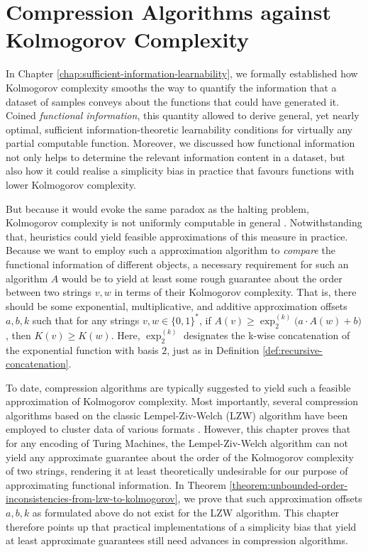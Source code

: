 
\chapter{Compression Algorithms against Kolmogorov Complexity}
\label{chap:compression-kolmogorov-complexity}

In Chapter \ref{chap:sufficient-information-learnability}, we formally established how Kolmogorov complexity smooths the way to quantify the information that a dataset of samples conveys about the functions that could have generated it.
Coined \textit{functional information}, this quantity allowed to derive general, yet nearly optimal, sufficient information-theoretic learnability conditions for virtually any partial computable function.
Moreover, we discussed how functional information not only helps to determine the relevant information content in a dataset, but also how it could realise a simplicity bias in practice that favours functions with lower Kolmogorov complexity.

But because it would evoke the same paradox as the halting problem, Kolmogorov complexity is not uniformly computable in general \cite{chaitin1974information}.
Notwithstanding that, heuristics could yield feasible approximations of this measure in practice.
Because we want to employ such a approximation algorithm to \textit{compare} the functional information of different objects, a necessary requirement for such an algorithm $A$ would be to yield at least some rough guarantee about the order between two strings $v,w$ in terms of their Kolmogorov complexity.
That is, there should be some exponential, multiplicative, and additive approximation offsets $a,b,k$ such that for any strings $v,w\in\{0,1\}^{*}$, if $A(v)\geq \exp_2^{(k)}\bigl(a\cdot A(w) + b\bigr)$, then $K(v)\geq K(w)$.
Here, $\exp_2^{(k)}$ designates the k-wise concatenation of the exponential function with basis $2$, just as in Definition \ref{def:recursive-concatenation}.

To date, compression algorithms are typically suggested to yield such a feasible approximation of Kolmogorov complexity.
Most importantly, several compression algorithms based on the classic Lempel-Ziv-Welch (LZW) algorithm \cite{welch1984technique} have been employed to cluster data of various formats \cite{cilibrasi2005clustering}.
However, this chapter proves that for any encoding of Turing Machines, the Lempel-Ziv-Welch algorithm can not yield any approximate guarantee about the order of the Kolmogorov complexity of two strings, rendering it at least theoretically undesirable for our purpose of approximating functional information.
In Theorem \ref{theorem:unbounded-order-inconsistencies-from-lzw-to-kolmogorov}, we prove that such approximation offsets $a,b,k$ as formulated above do not exist for the LZW algorithm.
This chapter therefore points up that practical implementations of a simplicity bias that yield at least approximate guarantees still need advances in compression algorithms.

